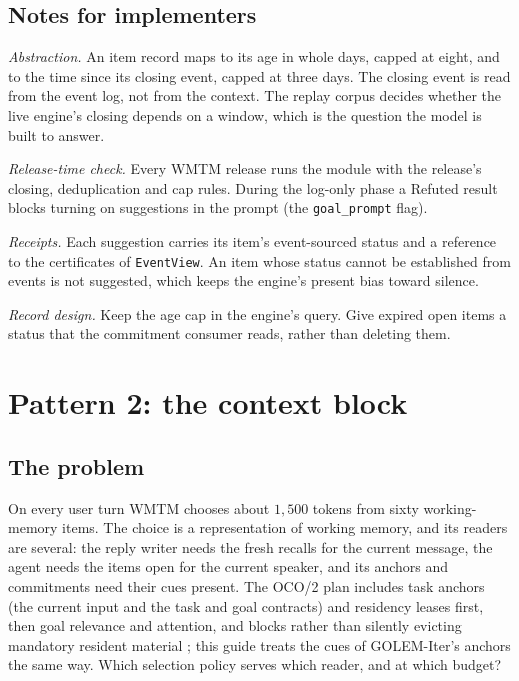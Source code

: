 \documentclass[11pt]{article}
\newcommand{\code}[1]{\texttt{#1}}
\theoremstyle{definition}
\theoremstyle{plain}
\begin{document}
\subsection{Notes for implementers}

\emph{Abstraction.} An item record maps to its age in whole days, capped at eight, and to the time
since its closing event, capped at three days. The closing event is read from the event log, not
from the context. The replay corpus decides whether the live engine's closing depends on a window,
which is the question the model is built to answer.

\emph{Release-time check.} Every WMTM release runs the module with the release's closing,
deduplication and cap rules. During the log-only phase a Refuted result blocks turning on
suggestions in the prompt (the \code{goal\_prompt} flag).

\emph{Receipts.} Each suggestion carries its item's event-sourced status and a reference to the
certificates of \code{EventView}. An item whose status cannot be established from events is not
suggested, which keeps the engine's present bias toward silence.

\emph{Record design.} Keep the age cap in the engine's query. Give expired open items a status that
the commitment consumer reads, rather than deleting them.

\section{Pattern 2: the context block}\label{sec:p2}

\subsection{The problem}

On every user turn WMTM chooses about $1{,}500$ tokens from sixty working-memory items. The choice
is a representation of working memory, and its readers are several: the reply writer needs the
fresh recalls for the current message, the agent needs the items open for the current speaker,
and its anchors and commitments need their cues present. The OCO/2 plan includes task anchors
(the current input and the task and goal contracts) and residency leases first, then goal relevance
and attention, and blocks rather than silently evicting mandatory resident material \cite{oco2};
this guide treats the cues of GOLEM-Iter's anchors the same way. Which selection policy serves which reader, and at which budget?
\end{document}
